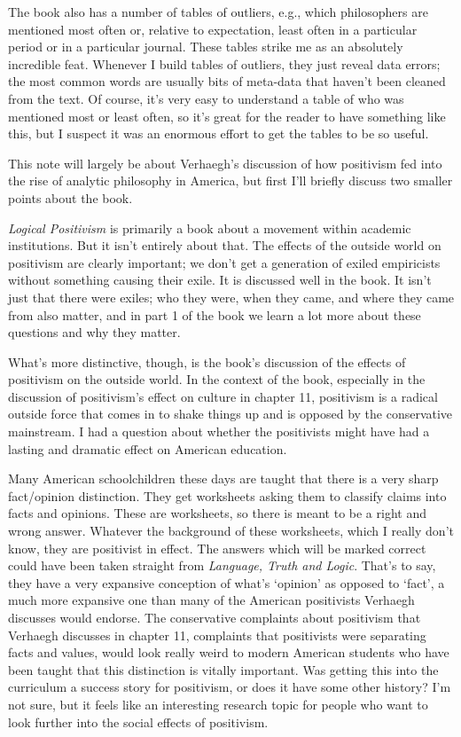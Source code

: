 \documentclass[
  11pt,
  letterpaper,
  DIV=11,
  numbers=noendperiod,
  twoside]{scrartcl}
\begin{document}
The book also has a number of tables of outliers, e.g., which
philosophers are mentioned most often or, relative to expectation, least
often in a particular period or in a particular journal. These tables
strike me as an absolutely incredible feat. Whenever I build tables of
outliers, they just reveal data errors; the most common words are
usually bits of meta-data that haven't been cleaned from the text. Of
course, it's very easy to understand a table of who was mentioned most
or least often, so it's great for the reader to have something like
this, but I suspect it was an enormous effort to get the tables to be so
useful.

This note will largely be about Verhaegh's discussion of how positivism
fed into the rise of analytic philosophy in America, but first I'll
briefly discuss two smaller points about the book.

\emph{Logical Positivism} is primarily a book about a movement within
academic institutions. But it isn't entirely about that. The effects of
the outside world on positivism are clearly important; we don't get a
generation of exiled empiricists without something causing their exile.
It is discussed well in the book. It isn't just that there were exiles;
who they were, when they came, and where they came from also matter, and
in part 1 of the book we learn a lot more about these questions and why
they matter.

What's more distinctive, though, is the book's discussion of the effects
of positivism on the outside world. In the context of the book,
especially in the discussion of positivism's effect on culture in
chapter 11, positivism is a radical outside force that comes in to shake
things up and is opposed by the conservative mainstream. I had a
question about whether the positivists might have had a lasting and
dramatic effect on American education.

Many American schoolchildren these days are taught that there is a very
sharp fact/opinion distinction. They get worksheets asking them to
classify claims into facts and opinions. These are worksheets, so there
is meant to be a right and wrong answer. Whatever the background of
these worksheets, which I really don't know, they are positivist in
effect. The answers which will be marked correct could have been taken
straight from \emph{Language, Truth and Logic}. That's to say, they have
a very expansive conception of what's `opinion' as opposed to `fact', a
much more expansive one than many of the American positivists Verhaegh
discusses would endorse. The conservative complaints about positivism
that Verhaegh discusses in chapter 11, complaints that positivists were
separating facts and values, would look really weird to modern American
students who have been taught that this distinction is vitally
important. Was getting this into the curriculum a success story for
positivism, or does it have some other history? I'm not sure, but it
feels like an interesting research topic for people who want to look
further into the social effects of positivism.
\end{document}
